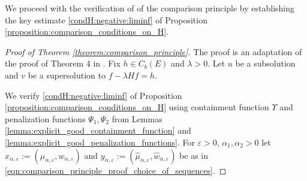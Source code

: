 \documentclass[a4paper]{article}
\numberwithin{equation}{section}
\theoremstyle{definition}
\begin{document}
We proceed with the verification of of the comparison principle by establishing the key estimate \eqref{condH:negative:liminf} of Proposition \ref{proposition:comparison_conditions_on_H}.


\begin{proof}[Proof of Theorem \ref{theorem:comparison_principle}]
	The proof is an adaptation of the proof of Theorem 4 in \cite{Kr16b}. Fix $h \in C_b(E)$ and $\lambda > 0$. Let $u$ be a subsolution and $v$ be a supersolution to $f - \lambda H f = h$.
	
	We verify \eqref{condH:negative:liminf} of Proposition \ref{proposition:comparison_conditions_on_H} using containment function $\Upsilon$ and penalization functions $\Psi_1,\Psi_2$ from Lemmas \ref{lemma:explicit_good_containment_function} and \ref{lemma:explicit_good_penalization_functions}. For $\varepsilon > 0$, $\alpha_1,\alpha_2 > 0$ let  $x_{\alpha,\varepsilon} := (\mu_{\alpha,\varepsilon},w_{\alpha,\varepsilon})$ and $y_{\alpha,\varepsilon} := (\hat{\mu}_{\alpha,\varepsilon},\hat{w}_{\alpha,\varepsilon})$ be as in \eqref{eqn:comparison_principle_proof_choice_of_sequences}.
	
	\smallskip
	

\end{proof}
\end{document}

